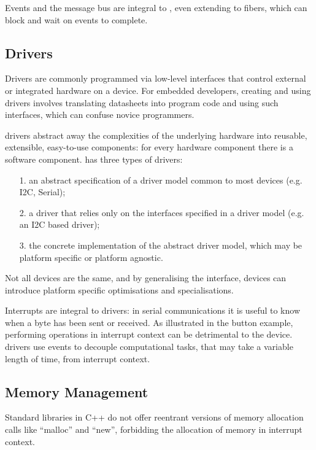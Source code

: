 Events and the message bus are integral to \CON, even extending to fibers, which can block and wait on events to complete. 

\subsection{Drivers}

Drivers are commonly programmed via low-level interfaces that control external or integrated hardware on a device. For embedded developers, creating and using drivers involves translating datasheets into program code and using such interfaces, which can confuse novice programmers.

\CO drivers abstract away the complexities of the underlying hardware into reusable, extensible, easy-to-use components: for every hardware component there is a software component. \CO has three types of drivers:
\begin{itemize}
    \item[1.] an abstract specification of a driver model common to most devices (e.g. I2C, Serial);
    \item[2.] a driver that relies only on the interfaces specified in a driver model  (e.g. an I2C based driver);
    \item[3.] the concrete implementation of the abstract driver model, which may be platform specific or platform agnostic.
\end{itemize}
Not all devices are the same, and by generalising the interface, devices can introduce platform specific optimisations and specialisations.

Interrupts are integral to drivers: in serial communications it is useful to know when a byte has been sent or received. As illustrated in the button example, performing operations in interrupt context can be detrimental to the device. \CO drivers use events to decouple computational tasks, that may take a variable length of time, from interrupt context.


\subsection{Memory Management}

Standard libraries in C++ do not offer reentrant versions of memory allocation calls like ``malloc'' and ``new'', forbidding the allocation of memory in interrupt context.

